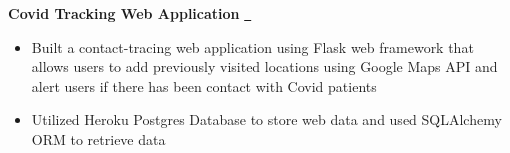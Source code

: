\textbf{Covid Tracking Web Application} \href{https://github.com/petezh/COVID-Analysis}{\github\ } \par
\begin{itemize}
	\item Built a contact-tracing web application using Flask web framework that allows users to add previously visited locations using Google Maps API and alert users if there has been contact with Covid patients
	\item Utilized Heroku Postgres Database to store web data and used SQLAlchemy ORM to retrieve data
\end{itemize}
\vspace{0.1cm} \par

